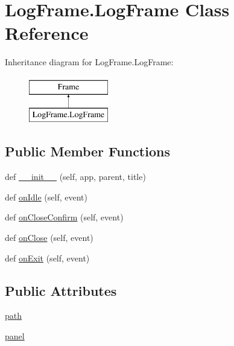 \hypertarget{classLogFrame_1_1LogFrame}{}\section{Log\+Frame.\+Log\+Frame Class Reference}
\label{classLogFrame_1_1LogFrame}
Inheritance diagram for Log\+Frame.\+Log\+Frame\+:\begin{figure}[H]
\begin{center}
\leavevmode
\includegraphics[height=2.000000cm]{classLogFrame_1_1LogFrame}
\end{center}
\end{figure}
\subsection*{Public Member Functions}
\begin{DoxyCompactItemize}
\item 
def \hyperlink{classLogFrame_1_1LogFrame_a756d5bc714b55aa93a21301a9986f8b1}{\+\_\+\+\_\+init\+\_\+\+\_\+} (self, app, parent, title)
\item 
def \hyperlink{classLogFrame_1_1LogFrame_af3d0abc16c93855ab9d760ff7b4c7d3e}{on\+Idle} (self, event)
\item 
def \hyperlink{classLogFrame_1_1LogFrame_a79ee5eea72f19f0a14aa047123125e1e}{on\+Close\+Confirm} (self, event)
\item 
def \hyperlink{classLogFrame_1_1LogFrame_afa3d32e2694b9e5a50279cbaf31cddba}{on\+Close} (self, event)
\item 
def \hyperlink{classLogFrame_1_1LogFrame_a53ce12d6947a1e35da471e5cb9d6011b}{on\+Exit} (self, event)
\end{DoxyCompactItemize}
\subsection*{Public Attributes}
\begin{DoxyCompactItemize}
\item 
\hyperlink{classLogFrame_1_1LogFrame_a851670425cc5380695a0790467740716}{path}
\item 
\hyperlink{classLogFrame_1_1LogFrame_af2f7bf9b22dcc769064bfdc91296977e}{panel}
\end{DoxyCompactItemize}

